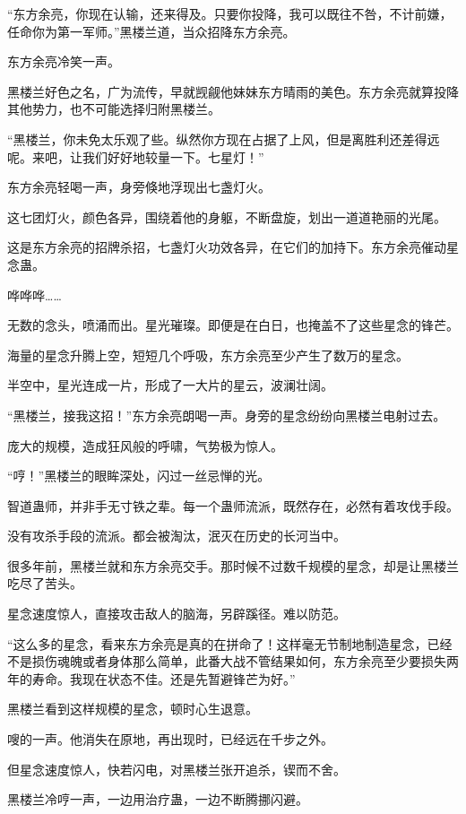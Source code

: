 \begin{this_body}
“东方余亮，你现在认输，还来得及。只要你投降，我可以既往不咎，不计前嫌，任命你为第一军师。”黑楼兰道，当众招降东方余亮。

东方余亮冷笑一声。

黑楼兰好色之名，广为流传，早就觊觎他妹妹东方晴雨的美色。东方余亮就算投降其他势力，也不可能选择归附黑楼兰。

“黑楼兰，你未免太乐观了些。纵然你方现在占据了上风，但是离胜利还差得远呢。来吧，让我们好好地较量一下。七星灯！”

东方余亮轻喝一声，身旁倏地浮现出七盏灯火。

这七团灯火，颜色各异，围绕着他的身躯，不断盘旋，划出一道道艳丽的光尾。

这是东方余亮的招牌杀招，七盏灯火功效各异，在它们的加持下。东方余亮催动星念蛊。

哗哗哗……

无数的念头，喷涌而出。星光璀璨。即便是在白日，也掩盖不了这些星念的锋芒。

海量的星念升腾上空，短短几个呼吸，东方余亮至少产生了数万的星念。

半空中，星光连成一片，形成了一大片的星云，波澜壮阔。

“黑楼兰，接我这招！”东方余亮朗喝一声。身旁的星念纷纷向黑楼兰电射过去。

庞大的规模，造成狂风般的呼啸，气势极为惊人。

“哼！”黑楼兰的眼眸深处，闪过一丝忌惮的光。

智道蛊师，并非手无寸铁之辈。每一个蛊师流派，既然存在，必然有着攻伐手段。

没有攻杀手段的流派。都会被淘汰，泯灭在历史的长河当中。

很多年前，黑楼兰就和东方余亮交手。那时候不过数千规模的星念，却是让黑楼兰吃尽了苦头。

星念速度惊人，直接攻击敌人的脑海，另辟蹊径。难以防范。

“这么多的星念，看来东方余亮是真的在拼命了！这样毫无节制地制造星念，已经不是损伤魂魄或者身体那么简单，此番大战不管结果如何，东方余亮至少要损失两年的寿命。我现在状态不佳。还是先暂避锋芒为好。”

黑楼兰看到这样规模的星念，顿时心生退意。

嗖的一声。他消失在原地，再出现时，已经远在千步之外。

但星念速度惊人，快若闪电，对黑楼兰张开追杀，锲而不舍。

黑楼兰冷哼一声，一边用治疗蛊，一边不断腾挪闪避。


\end{this_body}
